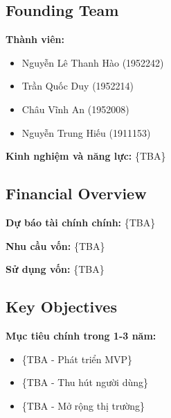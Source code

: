 \subsection{Founding Team}
\textbf{Thành viên:}
\begin{itemize}
    \item Nguyễn Lê Thanh Hào (1952242)
    \item Trần Quốc Duy (1952214) 
    \item Châu Vĩnh An (1952008)
    \item Nguyễn Trung Hiếu (1911153)
\end{itemize}

\textbf{Kinh nghiệm và năng lực:} \{TBA\}

\subsection{Financial Overview}
\textbf{Dự báo tài chính chính:} \{TBA\}

\textbf{Nhu cầu vốn:} \{TBA\}

\textbf{Sử dụng vốn:} \{TBA\}

\subsection{Key Objectives}
\textbf{Mục tiêu chính trong 1-3 năm:}
\begin{itemize}
    \item \{TBA - Phát triển MVP\}
    \item \{TBA - Thu hút người dùng\}
    \item \{TBA - Mở rộng thị trường\}
\end{itemize}